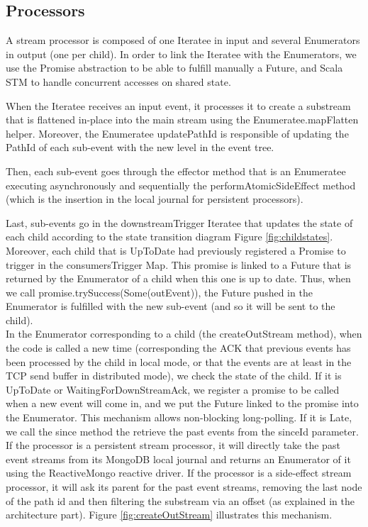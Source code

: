 \subsection{Processors}

A stream processor is composed of one Iteratee in input and several Enumerators in output (one per child). 
In order to link the Iteratee with the Enumerators, we use the Promise abstraction to be able to fulfill manually a Future, and Scala STM  to handle concurrent accesses on shared state. 

When the Iteratee receives an input event, it processes it to create a substream that is flattened in-place into the main stream using the Enumeratee.mapFlatten helper. Moreover, the Enumeratee updatePathId is responsible of updating the PathId of each sub-event with the new level in the event tree.

Then, each sub-event goes through the effector method that is an Enumeratee executing asynchronously and sequentially the performAtomicSideEffect method (which is the insertion
in the local journal for persistent processors).

Last, sub-events go in the downstreamTrigger Iteratee that updates the state of each child according to the state transition diagram Figure \ref{fig:childstates}. Moreover, each
child that is UpToDate had previously registered a Promise to trigger in the consumersTrigger Map. This promise is linked to a Future that is returned by the Enumerator of a child
when this one is up to date. Thus, when we call promise.trySuccess(Some(outEvent)), the Future pushed in the Enumerator is fulfilled with the new sub-event (and so it will be sent
to the child).
\\

In the Enumerator corresponding to a child (the createOutStream method), when the code is called a new time (corresponding the ACK that previous events has been processed by the child in local mode,
or that the events are at least in the TCP send buffer in distributed mode), we check the state of the child. If it is UpToDate or WaitingForDownStreamAck, we register
a promise to be called when a new event will come in, and we put the Future linked to the promise into the Enumerator. This mechanism allows non-blocking long-polling.
If it is Late, we call the since method the retrieve the past events from the sinceId parameter. If the processor is a persistent stream processor,
it will directly take the past event streams from its MongoDB local journal and returns an Enumerator of it using the ReactiveMongo reactive driver. If the processor is
a side-effect stream processor, it will ask its parent for the past event streams, removing the last node of the path id and then filtering the substream via an offset (as explained in the architecture part). 
Figure \ref{fig:createOutStream} illustrates this mechanism. 

